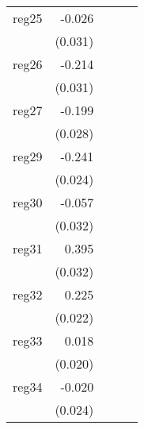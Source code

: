 {\begin{longtable}{l*{4}{D{.}{.}{-1}}}
\addlinespace
reg25       &      -0.026         &                     &                     &                     \\
            &     (0.031)         &                     &                     &                     \\
\addlinespace
reg26       &      -0.214\sym{***}&                     &                     &                     \\
            &     (0.031)         &                     &                     &                     \\
\addlinespace
reg27       &      -0.199\sym{***}&                     &                     &                     \\
            &     (0.028)         &                     &                     &                     \\
\addlinespace
reg29       &      -0.241\sym{***}&                     &                     &                     \\
            &     (0.024)         &                     &                     &                     \\
\addlinespace
reg30       &      -0.057         &                     &                     &                     \\
            &     (0.032)         &                     &                     &                     \\
\addlinespace
reg31       &       0.395\sym{***}&                     &                     &                     \\
            &     (0.032)         &                     &                     &                     \\
\addlinespace
reg32       &       0.225\sym{***}&                     &                     &                     \\
            &     (0.022)         &                     &                     &                     \\
\addlinespace
reg33       &       0.018         &                     &                     &                     \\
            &     (0.020)         &                     &                     &                     \\
\addlinespace
reg34       &      -0.020         &                     &                     &                     \\
            &     (0.024)         &                     &                     &                     \\

\end{longtable}}
